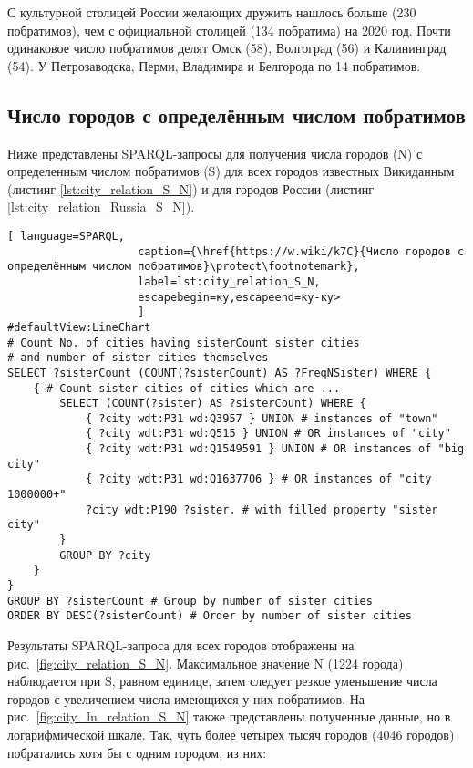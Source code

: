 С культурной столицей России желающих дружить нашлось больше (230 побратимов), чем с официальной столицей (134 побратима) на 2020 год. Почти одинаковое число побратимов делят Омск (58), Волгоград (56) и Калининград (54). У Петрозаводска, Перми, Владимира и Белгорода по 14 побратимов.

\subsection{Число городов с определённым числом побратимов}

Ниже представлены SPARQL-запросы для получения числа городов (N) с определенным числом побратимов (S) для всех городов известных Викиданным (листинг \ref{lst:city_relation_S_N}) и для городов России (листинг \ref{lst:city_relation_Russia_S_N}).

\begin{lstlisting}[ language=SPARQL, 
                    caption={\href{https://w.wiki/k7C}{Число городов с определённым числом побратимов}\protect\footnotemark},
                    label=lst:city_relation_S_N, 
                    escapebegin=ку,escapeend=ку-ку>
                    ]
#defaultView:LineChart
# Count No. of cities having sisterCount sister cities 
# and number of sister cities themselves
SELECT ?sisterCount (COUNT(?sisterCount) AS ?FreqNSister) WHERE {                                                                         
	{ # Count sister cities of cities which are ...
		SELECT (COUNT(?sister) AS ?sisterCount) WHERE {        
			{ ?city wdt:P31 wd:Q3957 } UNION # instances of "town"
			{ ?city wdt:P31 wd:Q515 } UNION # OR instances of "city"
			{ ?city wdt:P31 wd:Q1549591 } UNION # OR instances of "big city"
			{ ?city wdt:P31 wd:Q1637706 } # OR instances of "city 1000000+"
			?city wdt:P190 ?sister. # with filled property "sister city"
		}
		GROUP BY ?city
	}
}
GROUP BY ?sisterCount # Group by number of sister cities                                     
ORDER BY DESC(?sisterCount) # Order by number of sister cities   
\end{lstlisting}

Результаты SPARQL-запроса для всех городов отображены на рис.~\ref{fig:city_relation_S_N}. Максимальное значение N (\num{1224} города) наблюдается при S, равном единице, затем следует резкое уменьшение числа городов с увеличением числа имеющихся у них побратимов. На рис.~\ref{fig:city_ln_relation_S_N} также представлены полученные данные, но в логарифмической шкале. Так, чуть более четырех тысяч городов (\num{4046} городов) побратались хотя бы с одним городом, из них:

